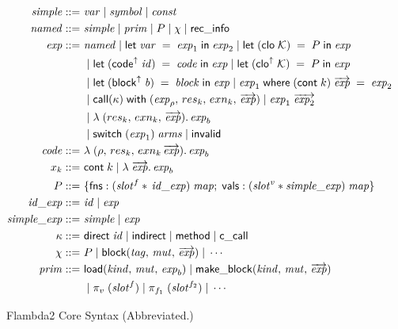 \documentclass[11pt,fleqn]{amsart}
\begin{document}
\newcommand{\eval}[2]{\langle #1, \, #2\rangle}
\newcommand{\rebind}[3]{#1 \; [ #2 \mapsto #3 ]}

\begin{figure}[ht]
  \footnotesize
  \begin{align*}
    \simple ::=~& \var \sep \symb \sep \const \\
    \named ::=~& \simple \sep \prim \sep P \sep \staticconsts \sep \recinfo \\
    \expr ::=~& \named \sep \letexp{\var}{\expr_1}{\expr_2} \sep \letcloexp{\mathcal{K}}{\setofclo}{\expr}\\
    & \sep \letcodeexp{\codeid}{\code}{\expr} \sep \letstaticcloexp{\mathcal{K}}{\setofclo}{\expr} \\
    & \sep \letblockexp{\blockpat}{\block}{\expr} \sep \letcont{\expr_1}{k}{\args{\expr}}{\expr_2} \\
    & \sep \apply{\callid}{\expr_{\rho}}{res_k}{exn_k}{\args{\expr}} \sep \applycont{\expr_1}{\args{\expr_2}} \\
    & \sep \abst{(res_k,\, exn_k,\, \args{\expr})}{\expr_b}\\
    & \sep \switch{\expr_1}{\arms} \sep \invalid \\
    \code ::=~& \abst{(\rho,\, res_k,\,exn_k\, \args{\expr})}{\expr_b} \\
    x_k ::=~& \contid{k} \sep \abst{\args{\expr}}{\expr_b} \\
    P ::=~& \{ \mathsf{fns} : (\mathit{slot}^{f} \ast \, \idexpr ) \; \mathit{map} ; \;
    \mathsf{vals} : (\mathit{slot}^{v} \ast \simpleexpr) \; \mathit{map} \}\\
    \idexpr ::=~& \codeid \sep \expr \\
    \simpleexpr ::=~& \simple \sep \expr \\
    \callid ::=~& \direct \; \codeid \sep \indirect \sep \method \sep \ccall \\
    \staticconsts ::=~& P \sep \blockconst{\mathit{tag}}{\mathit{mut}}{\args{\expr}} \sep \cdots \\
    \prim ::=~& \load{\mathit{kind}}{\mathit{mut}}{\expr_b} \sep \makeblock{\mathit{kind}}{\mathit{mut}}{\args{\expr}} \\
    & \sep \pi_{v} \; (\mathit{slot}^{f}) \sep \pi_{f_1} \; (\mathit{slot}^{f_2}) \sep \cdots
  \end{align*}
  \caption{Flambda2 Core Syntax (Abbreviated.) }
  \label{fig:syntax}
\end{figure}
\end{document}
